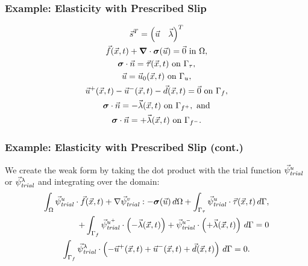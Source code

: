 \documentclass[aspectratio=169]{beamer}
\begin{document}
\begin{frame}
  \frametitle{Example: Elasticity with Prescribed Slip}



  \begin{gather}
    \vec{s}^T = \left( \vec{u} \quad \vec{\lambda} \right)^T \\
    \vec{f}(\vec{x},t) + \tensor{\nabla} \cdot \tensor{\sigma}(\vec{u}) = \vec{0} \text{ in }\Omega, \\
    \tensor{\sigma} \cdot \vec{n} = \vec{\tau}(\vec{x},t) \text{ on }\Gamma_\tau, \\
    \vec{u} = \vec{u}_0(\vec{x},t) \text{ on }\Gamma_u, \\
    \vec{u}^+(\vec{x},t) - \vec{u}^-(\vec{x},t) - \vec{d}(\vec{x},t) = \vec{0} \text{ on }\Gamma_f,  \\
    \tensor{\sigma} \cdot \vec{n} = -\vec{\lambda}(\vec{x},t) \text{ on }\Gamma_{f^+}, \text{ and}\\
    \tensor{\sigma} \cdot \vec{n} = +\vec{\lambda}(\vec{x},t) \text{ on }\Gamma_{f^-}.
  \end{gather}

\end{frame}


\begin{frame}
  \frametitle{Example: Elasticity with Prescribed Slip (cont.)}
  \summary{}

We create the weak form by taking the dot product with the trial function $\trialvec[u]$ or $\trialvec[\lambda]$ and integrating over the domain:
\begin{gather}
  \begin{split}
  \int_\Omega \trialvec[u] \cdot \vec{f}(\vec{x},t) + \nabla \trialvec[v] : -\tensor{\sigma}(\vec{u}) \, d\Omega
  + \int_{\Gamma_\tau} \trialvec[u] \cdot \vec{\tau}(\vec{x},t) \, d\Gamma, \\
  + \int_{\Gamma_{f}} \trialvec[u^+] \cdot \left(-\vec{\lambda}(\vec{x},t)\right)
  + \trialvec[u^-] \cdot \left(+\vec{\lambda}(\vec{x},t)\right)\, d\Gamma = 0
\end{split}\\
  \int_{\Gamma_{f}} \trialvec[\lambda] \cdot \left(
    -\vec{u}^+(\vec{x},t) + \vec{u}^-(\vec{x},t) + \vec{d}(\vec{x},t) \right) \, d\Gamma = 0.
\end{gather}

\end{frame}
\end{document}
